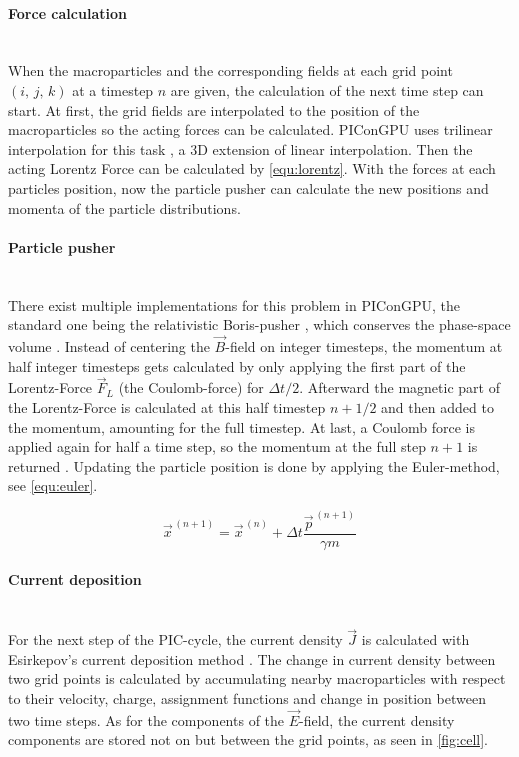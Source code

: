 \documentclass[bachelor_thesis]{subfiles}
\begin{document}
\paragraph*{Force calculation}\hspace{0pt} \\
When the macroparticles and the corresponding fields at each grid point $(i, \, j, \,k)$ at a timestep $n$ are given, the calculation of the next time step can start.
At first, the grid fields are interpolated to the position of the macroparticles so the acting forces can be calculated. PIConGPU uses trilinear interpolation for this task \cite{Huebl2019, PICRepo}, a 3D extension of linear interpolation.
Then the acting Lorentz Force can be calculated by \autoref{equ:lorentz}. With the forces at each particles position, now the particle pusher can calculate the new positions and momenta of the particle distributions.

\paragraph*{Particle pusher}\hspace{0pt} \\
There exist multiple implementations for this problem in PIConGPU, the standard one being the relativistic Boris-pusher \cite{Boris1970}, which conserves the phase-space volume \cite{PICRepo}. Instead of centering the $\vec{B}$-field on integer timesteps, the momentum at half integer timesteps gets
calculated by only applying the first part of the Lorentz-Force $\vec{F}_L$ (the Coulomb-force) for $\Delta t/2$. Afterward the magnetic part of the Lorentz-Force is calculated at this half timestep $n+1/2$ and then added to the momentum, amounting for the full timestep.
At last, a Coulomb force is applied again for half a time step, so the momentum at the full step $n+1$ is returned \cite{Zenitani2018, Pausch2019}. Updating the particle position is done by applying the Euler-method, see \autoref{equ:euler}.

\begin{equation}
	\vec{x}^{\,(n+1)} = \vec{x}^{\,(n)} + \Delta t \frac{\vec{p}^{\,(n+1)}}{\gamma m}
	\label{equ:euler}
\end{equation}

\paragraph*{Current deposition}\hspace{0pt} \\
For the next step of the PIC-cycle, the current density $\vec{J}$ is calculated with Esirkepov’s current deposition method \cite{Esirkepov2001}.
The change in current density between two grid points is calculated by accumulating nearby macroparticles with respect to their velocity, charge, assignment functions and change in position between two time steps. 
As for the components of the $\vec{E}$-field, the current density components are stored not on but between the grid points, as seen in \autoref{fig:cell}.
\end{document}
